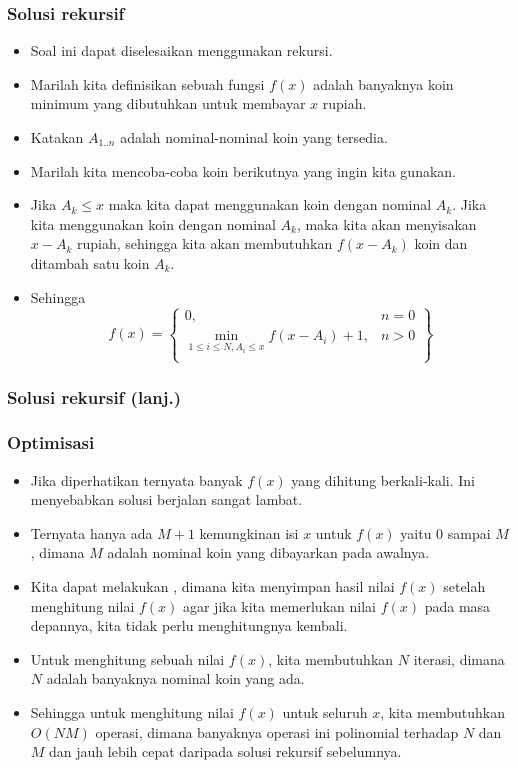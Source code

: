 \begin{frame}
\frametitle{Solusi rekursif}
\begin{itemize}
  \item Soal ini dapat diselesaikan menggunakan rekursi.
  \item Marilah kita definisikan sebuah fungsi $f(x)$ adalah banyaknya koin minimum yang dibutuhkan untuk membayar $x$ rupiah.
  \item Katakan $A_{1..n}$ adalah nominal-nominal koin yang tersedia.
  \item Marilah kita mencoba-coba koin berikutnya yang ingin kita gunakan.
  \item Jika $A_k \leq x$ maka kita dapat menggunakan koin dengan nominal $A_k$. Jika kita menggunakan koin dengan nominal $A_k$, maka kita akan menyisakan $x - A_k$ rupiah, sehingga kita akan membutuhkan $f(x-A_k)$ koin dan ditambah satu koin $A_k$.
   \item Sehingga 
   \[f(x) = \left\{\begin{array}{lr}
        0, & n = 0\\
        \min_{1 \leq i \leq N, A_i \leq x} {f(x - A_i) + 1}, & n > 0\\
        \end{array}\right\}\]
 \end{itemize}
\end{frame}

\begin{frame}
\frametitle{Solusi rekursif (lanj.)}
\end{frame}

\begin{frame}
\frametitle{Optimisasi}
\begin{itemize}
  \item Jika diperhatikan ternyata banyak $f(x)$ yang dihitung berkali-kali. Ini menyebabkan solusi berjalan sangat lambat.
  \item Ternyata hanya ada $M + 1$ kemungkinan isi $x$ untuk $f(x)$ yaitu $0$ sampai $M$, dimana $M$ adalah nominal koin yang dibayarkan pada awalnya.
  \item Kita dapat melakukan , dimana kita menyimpan hasil nilai $f(x)$ setelah menghitung nilai $f(x)$ agar jika kita memerlukan nilai $f(x)$ pada masa depannya, kita tidak perlu menghitungnya kembali.
  \item Untuk menghitung sebuah nilai $f(x)$, kita membutuhkan $N$ iterasi, dimana $N$ adalah banyaknya nominal koin yang ada.
  \item Sehingga untuk menghitung nilai $f(x)$ untuk seluruh $x$, kita membutuhkan $O(NM)$ operasi, dimana banyaknya operasi ini polinomial terhadap $N$ dan $M$ dan jauh lebih cepat daripada solusi rekursif sebelumnya.
\end{itemize}
\end{frame}

